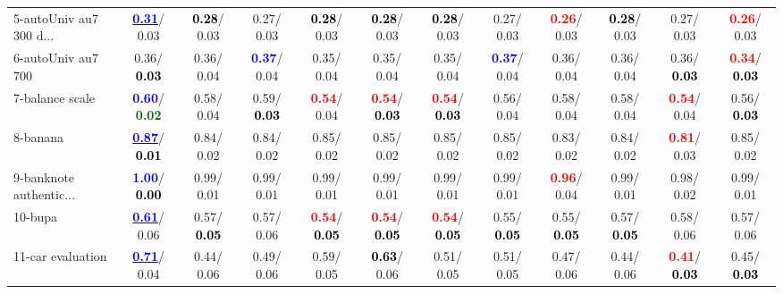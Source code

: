 \begin{table}[h]
\begin{center}
{\begin{tabular}{lc|c|c|c|c|c|c|c|c|c|c}
5-autoUniv au7 300 d... & \underline{\textcolor{blue}{\textbf{  0.31}}}/  0.03 & \textcolor{black}{\textbf{  0.28}}/  0.03 &   0.27/  0.03 & \textcolor{black}{\textbf{  0.28}}/  0.03 & \textcolor{black}{\textbf{  0.28}}/  0.03 & \textcolor{black}{\textbf{  0.28}}/  0.03 &   0.27/  0.03 & \textcolor{red}{\textbf{  0.26}}/  0.03 & \textcolor{black}{\textbf{  0.28}}/  0.03 &   0.27/  0.03 & \textcolor{red}{\textbf{  0.26}}/  0.03 \\
6-autoUniv au7 700 &   0.36/\textcolor{black}{\textbf{  0.03}} &   0.36/  0.04 & \textcolor{blue}{\textbf{  0.37}}/  0.04 &   0.35/  0.04 &   0.35/  0.04 &   0.35/  0.04 & \textcolor{blue}{\textbf{  0.37}}/  0.04 &   0.36/  0.04 &   0.36/  0.04 &   0.36/\textcolor{black}{\textbf{  0.03}} & \textcolor{red}{\textbf{  0.34}}/\textcolor{black}{\textbf{  0.03}} \\
7-balance scale & \textcolor{blue}{\textbf{  0.60}}/\textcolor{darkgreen}{\textbf{  0.02}} &   0.58/  0.04 &   0.59/\textcolor{black}{\textbf{  0.03}} & \textcolor{red}{\textbf{  0.54}}/  0.04 & \textcolor{red}{\textbf{  0.54}}/\textcolor{black}{\textbf{  0.03}} & \textcolor{red}{\textbf{  0.54}}/\textcolor{black}{\textbf{  0.03}} &   0.56/  0.04 &   0.58/  0.04 &   0.58/  0.04 & \textcolor{red}{\textbf{  0.54}}/  0.04 &   0.56/\textcolor{black}{\textbf{  0.03}} \\ \hline
8-banana & \underline{\textcolor{blue}{\textbf{  0.87}}}/\textcolor{black}{\textbf{  0.01}} &   0.84/  0.02 &   0.84/  0.02 &   0.85/  0.02 &   0.85/  0.02 &   0.85/  0.02 &   0.85/  0.02 &   0.83/  0.02 &   0.84/  0.02 & \textcolor{red}{\textbf{  0.81}}/  0.03 &   0.85/  0.02 \\
9-banknote authentic... & \textcolor{blue}{\textbf{  1.00}}/\textcolor{black}{\textbf{  0.00}} &   0.99/  0.01 &   0.99/  0.01 &   0.99/  0.01 &   0.99/  0.01 &   0.99/  0.01 &   0.99/  0.01 & \textcolor{red}{\textbf{  0.96}}/  0.04 &   0.99/  0.01 &   0.98/  0.02 &   0.99/  0.01 \\
10-bupa & \underline{\textcolor{blue}{\textbf{  0.61}}}/  0.06 &   0.57/\textcolor{black}{\textbf{  0.05}} &   0.57/  0.06 & \textcolor{red}{\textbf{  0.54}}/\textcolor{black}{\textbf{  0.05}} & \textcolor{red}{\textbf{  0.54}}/\textcolor{black}{\textbf{  0.05}} & \textcolor{red}{\textbf{  0.54}}/\textcolor{black}{\textbf{  0.05}} &   0.55/\textcolor{black}{\textbf{  0.05}} &   0.55/\textcolor{black}{\textbf{  0.05}} &   0.57/\textcolor{black}{\textbf{  0.05}} &   0.58/  0.06 &   0.57/  0.06 \\
11-car evaluation & \underline{\textcolor{blue}{\textbf{  0.71}}}/  0.04 &   0.44/  0.06 &   0.49/  0.06 &   0.59/  0.05 & \textcolor{black}{\textbf{  0.63}}/  0.06 &   0.51/  0.05 &   0.51/  0.05 &   0.47/  0.06 &   0.44/  0.06 & \textcolor{red}{\textbf{  0.41}}/\textcolor{black}{\textbf{  0.03}} &   0.45/\textcolor{black}{\textbf{  0.03}} \\

\end{tabular}}
\end{center}
\end{table}
